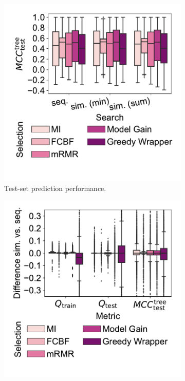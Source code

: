\documentclass{article}
\theoremstyle{definition}
\begin{document}
\begin{figure}[htb]
	\centering
	\begin{subfigure}[t]{0.48\textwidth}
		\centering
		\includegraphics[width=\textwidth, trim=15 40 15 10, clip]{plots/afs-impact-search-fs-method-decision-tree-test-mcc.pdf}
		\caption{Test-set prediction performance.}
		\label{fig:afs:impact-search-fs-method-decision-tree-test-mcc}
	\end{subfigure}
	\hfill
	\begin{subfigure}[t]{0.48\textwidth}
		\centering
		\includegraphics[width=\textwidth, trim=15 40 15 10, clip]{plots/afs-impact-search-fs-method-metric-diff.pdf}

\end{subfigure}
\end{figure}
\end{document}
